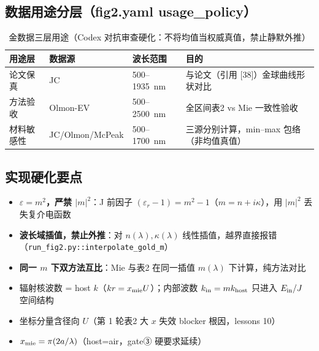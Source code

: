\subsection{数据用途分层（fig2.yaml usage\_policy）}

\begin{table}[H]
\centering
\footnotesize
\begin{tabular}{llll}
\toprule
用途层 & 数据源 & 波长范围 & 目的 \\
\midrule
论文保真 & JC & 500--1935~nm & 与论文（引用 [38]）金球曲线形状对比 \\
方法验收 & Olmon-EV & 500--2500~nm & 全区间表2 vs Mie 一致性验收 \\
材料敏感性 & JC/Olmon/McPeak & 500--1700~nm & 三源分别计算，min--max 包络（非均值真值） \\
\bottomrule
\end{tabular}
\caption{金数据三层用途（Codex 对抗审查硬化：不将均值当权威真值，禁止静默外推）}
\end{table}

\subsection{实现硬化要点}

\begin{itemize}
  \item \textbf{$\varepsilon = m^2$，严禁 $|m|^2$}：J 前因子 $(\varepsilon_r-1) = m^2-1$（$m = n+i\kappa$），用 $|m|^2$ 丢失复介电函数
  \item \textbf{波长域插值，禁止外推}：对 $n(\lambda), \kappa(\lambda)$ 线性插值，越界直接报错（\texttt{run\_fig2.py::interpolate\_gold\_m}）
  \item \textbf{同一 $m$ 下双方法互比}：Mie 与表2 在同一插值 $m(\lambda)$ 下计算，纯方法对比
  \item 辐射核波数 = host $k$（$kr = x_{\rm mie} U$）；内部波数 $k_{\rm in} = m k_{\rm host}$ 只进入 $E_{\rm in}/J$ 空间结构
  \item 坐标分量含径向 $U$（第 1 轮表2 大 $x$ 失效 blocker 根因，lessons 10）
  \item $x_{\rm mie} = \pi(2a/\lambda)$（host=air，gate③ 硬要求延续）
\end{itemize}

